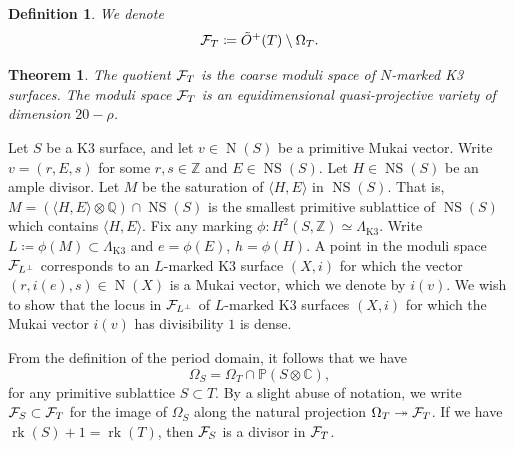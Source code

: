 \documentclass[11pt,twoside]{amsart}
\numberwithin{equation}{section}
\newtheorem{definition}[dummy]{Definition}
\newtheorem{theorem}[dummy]{Theorem}
\theoremstyle{definition}
\theoremstyle{plain}
\newcommand{\Z}{\ensuremath{\mathbb{Z}}}
\newcommand{\Q}{\ensuremath{\mathbb{Q}}}
\newcommand{\CC}{\ensuremath{\mathbb{C}}}
\newcommand{\PP}{\ensuremath{\mathbb{P}}}
\newcommand{\klat}{\ensuremath{\Lambda_{\operatorname{K3}}}}
\def\NS{\operatorname{NS}}
\def\rk{\operatorname{rk}}
\def\N{\operatorname{N}}
\def\toplus{\ensuremath{\tilde{O}^+}}
\begin{document}
\begin{definition}
    We denote $$\calF_{T}\coloneqq \toplus(T)\setminus \Omega_T.$$
\end{definition}
\begin{theorem}\cite[\S3]{Dol95}
    The quotient $\mathcal{F}_T$ is the coarse moduli space of $N$-marked K3 surfaces. The moduli space $\mathcal{F}_T$ is an equidimensional quasi-projective variety of dimension $20-\rho$.
\end{theorem}



Let $S$ be a K3 surface, and let $v\in \N(S)$ be a primitive Mukai vector. Write $v = (r,E,s)$ for some $r,s\in \Z$ and $E\in \NS(S)$. Let $H\in \NS(S)$ be an ample divisor. 
Let $M$ be the saturation of $\langle H,E\rangle$ in $\NS(S)$. That is, $M=\left(\langle H,E\rangle\otimes \Q\right) \cap \NS(S)$ is the smallest primitive sublattice of $\NS(S)$ which contains $\langle H,E\rangle$. 
Fix any marking $\phi: H^2(S,\Z)\simeq \klat$. Write $L\coloneqq \phi(M)\subset \klat$ and $e = \phi(E)$, $h = \phi(H)$. A point in the moduli space $\mathcal{F}_{L^\perp}$ corresponds to an $L$-marked K3 surface $(X,i)$ for which the vector $(r,i(e),s)\in \N(X)$ is a Mukai vector, which we denote by $i(v)$.
We wish to show that the locus in $\mathcal{F}_{L^\perp}$ of $L$-marked K3 surfaces $(X,i)$ for which the Mukai vector $i(v)$ has divisibility $1$ is dense.  

From the definition of the period domain, it follows that we have $$\Omega_S = \Omega_T\cap \PP(S\otimes \CC),$$ for any primitive sublattice $S\subset T$. By a slight abuse of notation, we write $\mathcal{F}_S\subset \mathcal{F}_T$ for the image of $\Omega_S$ along the natural projection $\Omega_T\twoheadrightarrow \mathcal{F}_T$. If we have $\rk(S)+1 = \rk(T)$, then $\mathcal{F}_S$ is a divisor in $\mathcal{F}_T$. 
\end{document}
